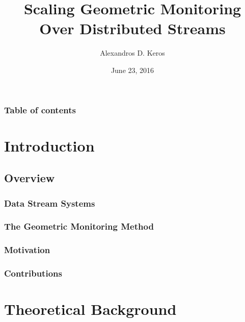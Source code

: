 \documentclass[hyperref={pdfpagelabels=false}]{beamer}
\title{Scaling Geometric Monitoring Over Distributed Streams}
\author{Alexandros D. Keros}
\date{June 23, 2016}
\begin{document}
\begin{frame}
\titlepage
\end{frame} 


\begin{frame}
\frametitle{Table of contents}
\tableofcontents
\end{frame} 

\section{Introduction}
\subsection*{Overview}
\begin{frame} \frametitle{Data Stream Systems}

\end{frame}
\begin{frame} \frametitle{The Geometric Monitoring Method}

\end{frame}
\begin{frame} \frametitle{Motivation}

\end{frame}
\begin{frame} \frametitle{Contributions}

\end{frame}
\section{Theoretical Background}
\end{document}
